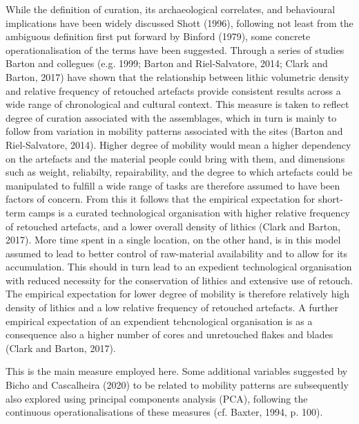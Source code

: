 \documentclass[
]{article}
\begin{document}
While the definition of curation, its archaeological correlates, and behavioural implications have been widely discussed Shott (1996), following not least from the ambiguous definition first put forward by Binford (1979), some concrete operationalisation of the terms have been suggested. Through a series of studies Barton and collegues (e.g. 1999; Barton and Riel-Salvatore, 2014; Clark and Barton, 2017) have shown that the relationship between lithic volumetric density and relative frequency of retouched artefacts provide consistent results across a wide range of chronological and cultural context. This measure is taken to reflect degree of curation associated with the assemblages, which in turn is mainly to follow from variation in mobility patterns associated with the sites (Barton and Riel-Salvatore, 2014). Higher degree of mobility would mean a higher dependency on the artefacts and the material people could bring with them, and dimensions such as weight, reliabilty, repairability, and the degree to which artefacts could be manipulated to fulfill a wide range of tasks are therefore assumed to have been factors of concern. From this it follows that the empirical expectation for short-term camps is a curated technological organisation with higher relative frequency of retouched artefacts, and a lower overall density of lithics (Clark and Barton, 2017). More time spent in a single location, on the other hand, is in this model assumed to lead to better control of raw-material availability and to allow for its accumulation. This should in turn lead to an expedient technological organisation with reduced necessity for the conservation of lithics and extensive use of retouch. The empirical expectation for lower degree of mobility is therefore relatively high density of lithics and a low relative frequency of retouched artefacts. A further empirical expectation of an expendient tehcnological organisation is as a consequence also a higher number of cores and unretouched flakes and blades (Clark and Barton, 2017).

This is the main measure employed here. Some additional variables suggested by Bicho and Cascalheira (2020) to be related to mobility patterns are subsequently also explored using principal components analysis (PCA), following the continuous operationalisations of these measures (cf. Baxter, 1994, p. 100).
\end{document}

